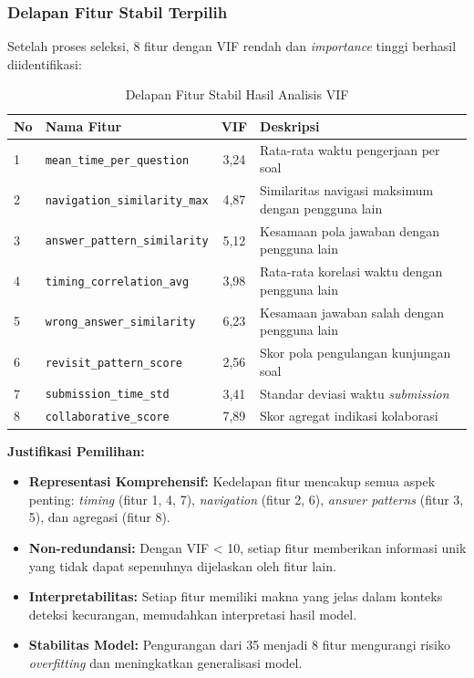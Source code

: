 \subsubsection{Delapan Fitur Stabil Terpilih}
Setelah proses seleksi, 8 fitur dengan VIF rendah dan \textit{importance} tinggi berhasil diidentifikasi:

\begin{table}[htbp]
\centering
\caption{Delapan Fitur Stabil Hasil Analisis VIF}
\label{tabel:fiturStabil}
\begin{tabular}{|l|l|c|p{5cm}|}
\hline
\textbf{No} & \textbf{Nama Fitur} & \textbf{VIF} & \textbf{Deskripsi} \\
\hline
1 & \texttt{mean\_time\_per\_question} & 3,24 & Rata-rata waktu pengerjaan per soal \\
\hline
2 & \texttt{navigation\_similarity\_max} & 4,87 & Similaritas navigasi maksimum dengan pengguna lain \\
\hline
3 & \texttt{answer\_pattern\_similarity} & 5,12 & Kesamaan pola jawaban dengan pengguna lain \\
\hline
4 & \texttt{timing\_correlation\_avg} & 3,98 & Rata-rata korelasi waktu dengan pengguna lain \\
\hline
5 & \texttt{wrong\_answer\_similarity} & 6,23 & Kesamaan jawaban salah dengan pengguna lain \\
\hline
6 & \texttt{revisit\_pattern\_score} & 2,56 & Skor pola pengulangan kunjungan soal \\
\hline
7 & \texttt{submission\_time\_std} & 3,41 & Standar deviasi waktu \textit{submission} \\
\hline
8 & \texttt{collaborative\_score} & 7,89 & Skor agregat indikasi kolaborasi \\
\hline
\end{tabular}
\end{table}

\textbf{Justifikasi Pemilihan:}
\begin{itemize}
    \item \textbf{Representasi Komprehensif:} Kedelapan fitur mencakup semua aspek penting: \textit{timing} (fitur 1, 4, 7), \textit{navigation} (fitur 2, 6), \textit{answer patterns} (fitur 3, 5), dan agregasi (fitur 8).
    \item \textbf{Non-redundansi:} Dengan VIF < 10, setiap fitur memberikan informasi unik yang tidak dapat sepenuhnya dijelaskan oleh fitur lain.
    \item \textbf{Interpretabilitas:} Setiap fitur memiliki makna yang jelas dalam konteks deteksi kecurangan, memudahkan interpretasi hasil model.
    \item \textbf{Stabilitas Model:} Pengurangan dari 35 menjadi 8 fitur mengurangi risiko \textit{overfitting} dan meningkatkan generalisasi model.
\end{itemize}

